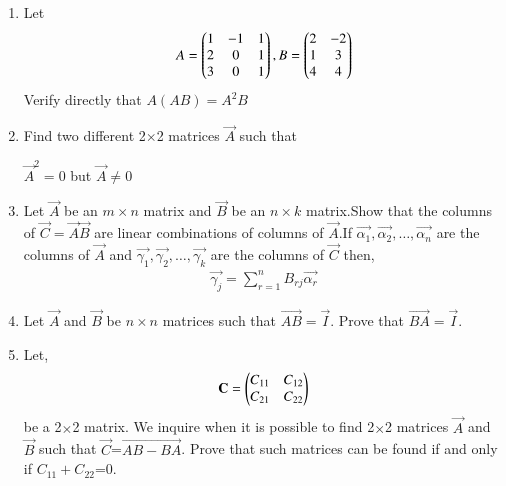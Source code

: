\renewcommand{\theequation}{\theenumi}
\renewcommand{\thefigure}{\theenumi}
\begin{enumerate}[label=\thesubsection.\arabic*.,ref=\thesubsection.\theenumi]
%
\item Let
\begin{align}
   A=\begin{pmatrix}1&-1&1\\2&0&1\\3&0&1\end{pmatrix}, B=\begin{pmatrix}2&-2\\1&3\\4&4\end{pmatrix}
\end{align}
Verify directly that $ A(AB)=A^2B $
%
\solution

%

%
\item Find two different 2$\times$2 matrices $\vec{A}$ such that 

$\vec{A}^{2}=0$ but $\vec{A}\ne0$
%
\\
\solution


%
\item Let $\vec{A}$ be an $m \times n$ matrix and $\vec{B}$ be an $n \times k$ matrix.Show that the columns of $\vec{C}=\vec{A}\vec{B}$ are linear combinations of columns of $\vec{A}$.If $\vec{\alpha_1},\vec{\alpha_2},\hdots,\vec{\alpha_n}$ are the columns of $\vec{A}$ and $\vec{\gamma_1},\vec{\gamma_2},\hdots,\vec{\gamma_k}$ are the columns of $\vec{C}$ then,
\begin{align}
    \vec{\gamma_j}= \sum_{r=1}^{n}B_{rj}\vec{\alpha_r} 
\end{align}
%
\solution

%
\item Let $\vec{A}$ and $\vec{B}$ be $n \times n$ matrices such that $\vec{AB}=\vec{I}$. Prove that $\vec{BA}=\vec{I}$.
%
\solution

%
\item Let,
\begin{align}
\mathbf{C}=\begin{pmatrix}C_{11}&C_{12}\\C_{21}&C_{22}\end{pmatrix}
\end{align}
be a 2$\times$2 matrix. We inquire when it is possible to find 2$\times$2 matrices $\vec{A}$ and $\vec{B}$ such that $\vec{C}$=$\vec{AB-BA}$. Prove that such matrices can be found if and only if $C_{11}+C_{22}$=0.
%
\solution



\end{enumerate}
